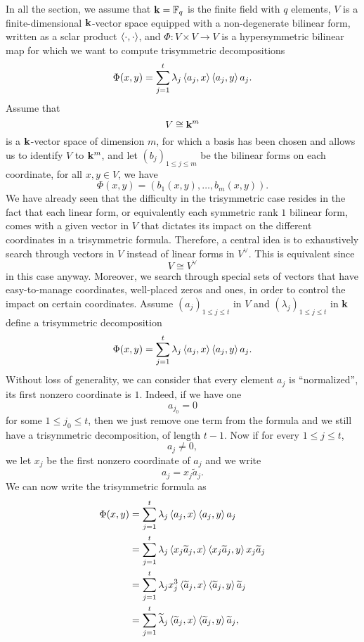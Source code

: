 In all the section, we assume that $\mathbf{k}=\mathbb{F}_q$ is the finite field with
$q$ elements, $V$ is a finite-dimensional $\mathbf{k}$-vector space equipped with a
non-degenerate bilinear form, written as a sclar product $\left\langle\cdot,\cdot\right\rangle$,
and $\Phi:V\times V\to V$ is a hypersymmetric bilinear map for which we want to
compute trisymmetric decompositions
\[
  \Phi(x, y) = \sum_{j=1}^t\lambda_j\left\langle a_j,x\right\rangle\left\langle a_j,y\right\rangle a_j.
\]
Assume that
\[
  V\cong\mathbf{k}^m
\]
is a $\mathbf{k}$-vector space of dimension $m$, for which a basis has been chosen and
allows us to identify $V$ to $\mathbf{k}^m$, and
let $(b_j)_{1\leq j\leq m}$ be the bilinear forms on each coordinate, \ie for
all $x,y\in V$, we have
\[
  \Phi(x, y) = (b_1(x, y), \dots, b_m(x, y)).
\]
We have already seen that the difficulty in the trisymmetric case resides in the
fact that each linear form, or equivalently each symmetric rank $1$ bilinear
form, comes with a given vector in $V$ that dictates its impact on the different
coordinates in a trisymmetric formula. Therefore, a central idea is to
exhaustively search through vectors in $V$ instead of linear forms in $V^\vee$.
This is equivalent since 
\[
  V\cong V^\vee
\]
in this case anyway. Moreover, we search through special sets of vectors that
have easy-to-manage coordinates, \eg well-placed zeros and ones, in order to
control the impact on certain coordinates. Assume $(a_j)_{1\leq j \leq t}$ in $V$ and
$(\lambda_j)_{1\leq j \leq t}$ in $\mathbf{k}$ define a trisymmetric decomposition
\[
  \Phi(x, y) = \sum_{j=1}^t\lambda_j\left\langle a_j,x\right\rangle\left\langle a_j,y\right\rangle a_j.
\]
Without loss of generality, we can consider that every element $a_j$ is
``normalized'', \ie its first nonzero coordinate is $1$. Indeed, if we have one
\[
  a_{j_0} = 0
\]
for some $1\leq j_0 \leq t$, then we just remove one term from the formula and
we still have a trisymmetric decomposition, of length $t-1$. Now if for every
$1\leq j\leq t$, 
\[
  a_j\neq0,
\]
we let $x_j$ be the first nonzero coordinate of $a_j$ and we write
\[
  a_j = x_j \widetilde a_j.
\]
We can now write the trisymmetric formula as
\begin{align*}
  \Phi(x, y) &= \sum_{j=1}^t\lambda_j\left\langle a_j,x\right\rangle\left\langle a_j,y\right\rangle a_j \\
  &= \sum_{j=1}^t\lambda_j\left\langle x_j\widetilde a_j,x\right\rangle\left\langle x_j\widetilde
  a_j,y\right\rangle x_j\widetilde a_j \\
  &= \sum_{j=1}^t\lambda_jx_j^3\left\langle\widetilde a_j,x\right\rangle\left\langle\widetilde
  a_j,y\right\rangle\widetilde a_j \\
  &= \sum_{j=1}^t\widetilde \lambda_j\left\langle\widetilde a_j,x\right\rangle\left\langle\widetilde
  a_j,y\right\rangle\widetilde a_j,
\end{align*}
